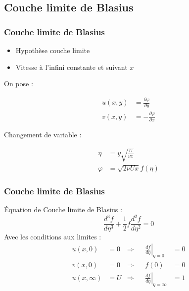 \documentclass{beamer}
\begin{document}
\subsection{Couche limite de Blasius}\label{sub:Blasius}

\begin{frame}
\frametitle{Couche limite de Blasius}
\begin{itemize}
\item Hypothèse couche limite
\item Vitesse à l'infini constante et suivant $x$
\end{itemize}
On pose :

\begin{align*}
	u(x,y) &= 
	\frac{\partial \varphi}{\partial y} \\
	v(x,y) &= - 
	\frac{\partial \varphi}{\partial x}
\end{align*}

Changement de variable :

\begin{align*}
	\eta &= y \sqrt{\frac{U}{\nu x }} \\
	\varphi &= \sqrt{2\nu U x} f(\eta)
\end{align*}
\end{frame}

\begin{frame}
\frametitle{Couche limite de Blasius}
Équation de  Couche limite de Blasius :
\begin{equation}	
	\frac{d^{3}f}{d\eta^{3}} + \frac{1}{2}f\frac{d^{2} f}{d\eta^{2}} = 0
\end{equation}
Avec les conditions aux limites :
\begin{align}
	u(x,0) &= 0 &\Rightarrow &&
	\left.
	\frac{d f}{d \eta}     \right|_{\eta = 0} &= 0
	\\
	v(x,0) &= 0 &\Rightarrow &&
	f(0) &= 0
	\\
	u(x,\infty) &= U &\Rightarrow &&
	\left.
	\frac{d f}{d \eta} \right|_{\eta = \infty} &= 1
\end{align}
\end{frame}
\end{document}
